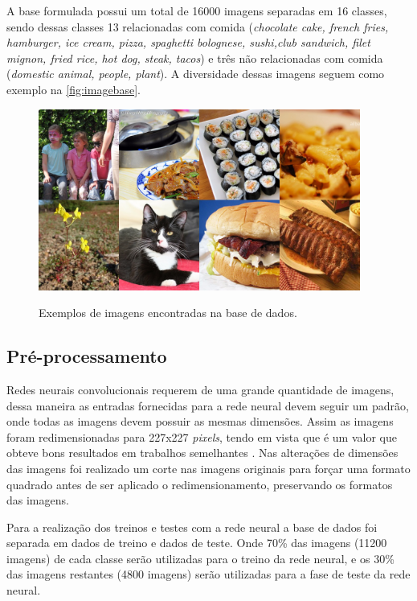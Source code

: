 \par A base formulada possui um total de 16000 imagens separadas em 16 classes, sendo dessas classes 13  relacionadas com comida (\textit{chocolate cake, french fries, hamburger, ice cream, pizza, spaghetti bolognese, sushi,club sandwich, filet mignon, fried rice, hot dog, steak, tacos}) e três não relacionadas com comida (\textit{domestic animal, people, plant}). A diversidade dessas imagens seguem como exemplo na \autoref{fig:imagebase}.
\begin{figure}[H]
  \centering
  \caption{Exemplos de imagens encontradas na base de dados.}
  \includegraphics[width=300pt]{dados/figuras/imagembase}
  \label{fig:imagebase}
\end{figure}

\subsection{Pré-processamento}
\par Redes neurais convolucionais requerem de uma grande quantidade de imagens, dessa maneira as entradas fornecidas para a rede neural devem seguir um padrão, onde todas as imagens devem possuir as mesmas dimensões. Assim as imagens foram redimensionadas para 227x227 \textit{pixels}, tendo em vista que é um valor que obteve bons resultados em trabalhos semelhantes \cite{imaginetArticle}. Nas alterações de dimensões das imagens foi realizado um corte nas imagens originais para forçar uma formato quadrado antes de ser aplicado o redimensionamento, preservando os formatos das imagens.
\par Para a realização dos treinos e testes com a rede neural a base de dados foi separada em dados de treino e dados de teste. Onde 70\% das imagens (11200 imagens) de cada classe serão utilizadas para o treino da rede neural, e os 30\% das imagens restantes  (4800 imagens) serão utilizadas para a fase de teste da rede neural.

